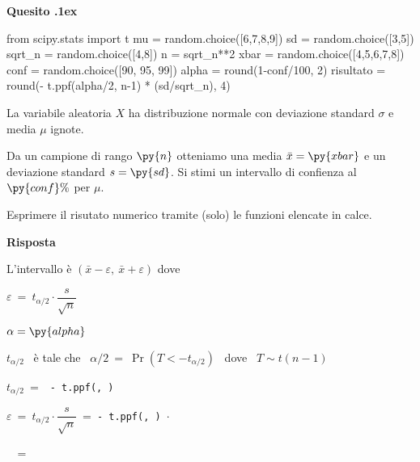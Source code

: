 \documentclass[11pt,twoside,a4paper]{article}
\newcounter{quesito}
\newenvironment{question}{\addtocounter{quesito}{1}\par\textbf{Quesito \thequesito.\kern1ex}}{\vspace{0.5\parskip}}
\newenvironment{answer}{\par\textbf{Risposta\quad}}{\vspace{\parskip}}
\begin{document}
\begin{question} 
\begin{pycode}
from scipy.stats import t
mu = random.choice([6,7,8,9])
sd = random.choice([3,5])
sqrt_n = random.choice([4,8])
n = sqrt_n**2
xbar =  random.choice([4,5,6,7,8])
conf = random.choice([90, 95, 99])
alpha = round(1-conf/100, 2)
risultato = round(- t.ppf(alpha/2, n-1) * (sd/sqrt_n), 4)
\end{pycode}
La variabile aleatoria $X$ ha distribuzione normale con deviazione standard $\sigma$ e media $\mu$ ignote.

Da un campione di rango $\py{n}$ otteniamo una media $\bar x=\py{xbar}$ e un deviazione standard $s=\py{sd}$. Si stimi un intervallo di confienza al $\py{conf}\%$ per $\mu$.

Esprimere il risutato numerico tramite (solo) le funzioni elencate in calce.
\begin{answer}


L'intervallo è $(\bar x-\varepsilon,\ \bar x+\varepsilon)$ dove

$\varepsilon\ =\ t_{\alpha/2}\cdot\dfrac{s}{\sqrt{n}}$ 

$\alpha = \py{alpha}$

$t_{\alpha/2}$ \ è tale che \ $\alpha/2\ =\ \Pr(T<-t_{\alpha/2})$ \ dove \ $T\sim t(n-1)$

$t_{\alpha/2}\ =\ $\ {\tt - t.ppf(, )}

$\varepsilon\ =\ t_{\alpha/2}\cdot\dfrac{s}{\sqrt{n}}\ =\ ${\color{blue}\tt - t.ppf(, ) $\cdot$ }

$\phantom{\varepsilon}$\ =\ {\tt {}}
\end{answer}
\end{question}
\end{document}
